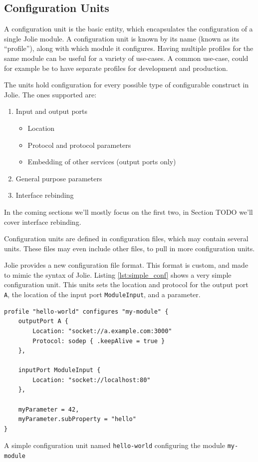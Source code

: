 \subsection{Configuration Units}
\label{sec:conf_units}

A configuration unit is the basic entity, which encapsulates the configuration
of a single Jolie module. A configuration unit is known by its name (known as
its ``profile''), along with which module it configures. Having multiple profiles
for the same module can be useful for a variety of use-cases. A common
use-case, could for example be to have separate profiles for development and
production.

The units hold configuration for every possible type of configurable construct
in Jolie. The ones supported are:

\begin{enumerate}
    \item Input and output ports
        \begin{itemize}
            \item Location
            \item Protocol and protocol parameters
            \item Embedding of other services (output ports only)
        \end{itemize}
    \item General purpose parameters
    \item Interface rebinding
\end{enumerate}

In the coming sections we'll mostly focus on the first two, in Section TODO
we'll cover interface rebinding.

Configuration units are defined in configuration files, which may contain
several units. These files may even include other files, to pull in more
configuration units.

Jolie provides a new configuration file format. This format is custom, and made
to mimic the syntax of Jolie. Listing \ref{lst:simple_conf} shows a very
simple configuration unit. This units sets the location and protocol for the
output port \texttt{A}, the location of the input port
\texttt{ModuleInput}, and a parameter.

\begin{listing}[H]
\begin{verbatim}
profile "hello-world" configures "my-module" {
    outputPort A {
        Location: "socket://a.example.com:3000"
        Protocol: sodep { .keepAlive = true }
    },

    inputPort ModuleInput {
        Location: "socket://localhost:80"
    },

    myParameter = 42,
    myParameter.subProperty = "hello"
}
\end{verbatim}

\caption{A simple configuration unit named \texttt{hello-world}
    configuring the module \texttt{my-module}}

\label{lst:simple_conf}

\end{listing}

